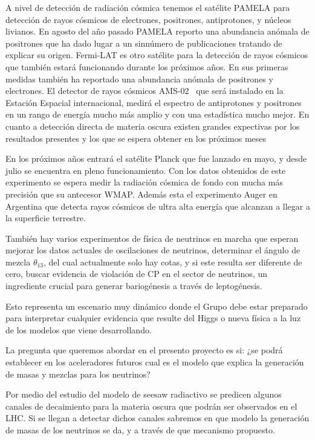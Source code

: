 A nivel de detección de radiación cósmica tenemos el satélite PAMELA para detección de rayos cósmicos de electrones, positrones, antiprotones, y núcleos livianos. En agosto del año pasado PAMELA reporto una abundancia anómala de positrones %
que ha dado lugar a un sinnúmero de publicaciones tratando de explicar su origen.  Fermi-LAT es otro satélite para la detección de rayos cósmicos que también estará funcionando  durante los próximos años. En sus primeras medidas %
también ha reportado una abundancia anómala de positrones y electrones. El detector de rayos cósmicos AMS-02~%
que será instalado en la Estación Espacial  internacional, medirá el espectro de antiprotones y positrones en un rango de energía mucho más amplio y con una estadística mucho mejor. En cuanto a detección directa de materia oscura existen grandes expectivas por los resultados presentes y los que se espera obtener en los próximos meses %

En los próximos años entrará el satélite Planck que fue lanzado en mayo, y desde julio  se encuentra en pleno funcionamiento. Con los datos obtenidos de este experimento se espera medir la radiación cósmica de fondo con mucha más precisión que su antecesor WMAP. Además esta el experimento Auger en Argentina que detecta rayos cósmicos de ultra alta energía que alcanzan a llegar a la superficie terrestre.

También hay varios experimentos de física de neutrinos en marcha que esperan mejorar los datos actuales de oscilaciones de neutrinos, determinar el ángulo de mezcla $\theta_{13}$, del cual actualmente solo hay cotas, y si este resulta ser diferente de cero, buscar evidencia de violación de CP en el sector de neutrinos, un ingrediente crucial para generar bariogénesis a través de leptogénesis.

Esto representa un escenario muy dinámico donde el Grupo debe estar preparado para interpretar cualquier evidencia que resulte del Higgs o nueva física a la luz de los modelos que viene desarrollando.
	
La pregunta que queremos abordar en el presento proyecto es si:
¿se podrá establecer en los aceleradores futuros cual es el modelo que
explica la generación de masas y mezclas para los neutrinos?

Por medio del estudio del modelo de seesaw radiactivo se predicen algunos canales de decaimiento para la materia oscura que podrán ser observados en el LHC. Si se llegan a detectar dichos canales sabremos en que modelo la generación de masas de los neutrinos se da, y a través de que mecanismo propuesto.

